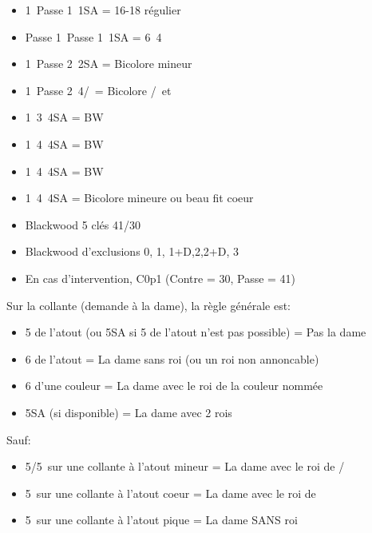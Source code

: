\documentclass[a4paper, oneside, 11pt]{report}
\begin{document}
\newpage
		\begin{itemize}
		\item 1\trefle\ Passe 1\pique\ 1SA = 16-18 régulier
		\item Passe 1\trefle\ Passe 1\pique\ 1SA = 6\carreau\ 4\coeur\\
	
		\item 1\pique\ Passe 2\pique\ 2SA = Bicolore mineur
		\item 1\pique\ Passe 2\pique\ 4\trefle/\carreau\ = Bicolore \trefle/\carreau\ et \coeur\\
	
		\item 1\coeur\ 3\pique\ 4SA = BW \coeur
		\item 1\coeur\ 4\carreau\ 4SA = BW \coeur
		\item 1\pique\ 4\coeur\ 4SA = BW \pique
		\item 1\coeur\ 4\pique\ 4SA = Bicolore mineure ou beau fit coeur\\
		\end{itemize}

	\begin{itemize}
	\item Blackwood 5 clés 41/30
	\item Blackwood d'exclusions 0, 1, 1+D,2,2+D, 3
	\item En cas d'intervention,  C0p1 (Contre = 30,  Passe = 41)\\
	\end{itemize}
	
	Sur la collante (demande à la dame), la règle générale est:
	\begin{itemize}
	\item 5 de l'atout (ou 5SA si 5 de l'atout n'est pas possible) = Pas la dame
	\item 6 de l'atout = La dame sans roi (ou un roi non annoncable)
	\item 6 d'une couleur = La dame avec le roi de la couleur nommée
	\item 5SA (si disponible) = La dame avec 2 rois\\
	\end{itemize}

	Sauf:
	\begin{itemize}
	\item 5\coeur/5\pique\ sur une collante à l'atout mineur = La dame avec le roi de \coeur/\pique
	\item 5\pique\ sur une collante à l'atout coeur = La dame avec le roi de \pique
	\item 5\coeur\ sur une collante à l'atout pique = La dame SANS roi\\\\
	\end{itemize}
	
\end{document}
